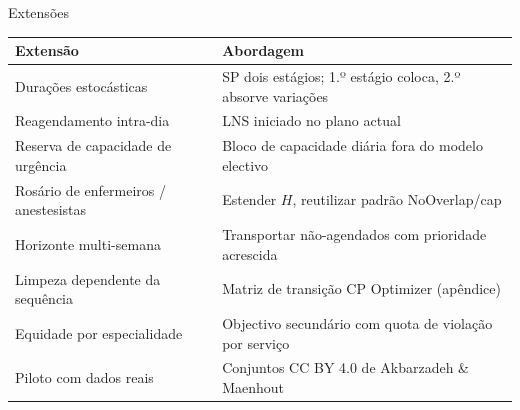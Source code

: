 \documentclass[10pt,aspectratio=169]{beamer}
\newcommand{\bk}{\hfill\hyperlink{toc}{\beamerreturnbutton{Agenda}}}
\begin{document}
\begin{frame}{Extens\~oes}
  \begin{center}\small
  \begin{tabular}{ll}
    \toprule
    Extens\~ao & Abordagem \\
    \midrule
    Dura\c{c}\~oes estoc\'asticas & SP dois est\'agios; 1.º est\'agio coloca, 2.º absorve varia\c{c}\~oes \\
    Reagendamento intra-dia & LNS iniciado no plano actual \\
    Reserva de capacidade de urg\^encia & Bloco de capacidade di\'aria fora do modelo electivo \\
    Ros\'ario de enfermeiros / anestesistas & Estender $H$, reutilizar padr\~ao NoOverlap/cap \\
    Horizonte multi-semana & Transportar n\~ao-agendados com prioridade acrescida \\
    Limpeza dependente da sequ\^encia & Matriz de transi\c{c}\~ao CP Optimizer (ap\^endice) \\
    Equidade por especialidade & Objectivo secund\'ario com quota de viola\c{c}\~ao por servi\c{c}o \\
    Piloto com dados reais & Conjuntos CC BY 4.0 de Akbarzadeh \& Maenhout \\
    \bottomrule
  \end{tabular}
  \end{center}
  \bk
\end{frame}
\end{document}
